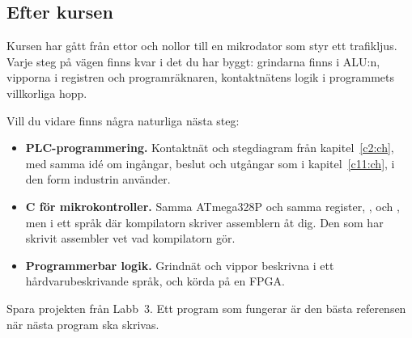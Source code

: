 \subsection*{Efter kursen}
Kursen har gått från ettor och nollor till en mikrodator som styr ett trafikljus. Varje steg på
vägen finns kvar i det du har byggt: grindarna finns i ALU:n, vipporna i registren och
programräknaren, kontaktnätens logik i programmets villkorliga hopp.

Vill du vidare finns några naturliga nästa steg:
\begin{itemize}
  \item \textbf{PLC-programmering.} Kontaktnät och stegdiagram från kapitel~\ref{c2:ch}, med samma
    idé om ingångar, beslut och utgångar som i kapitel~\ref{c11:ch}, i den form industrin
    använder.
  \item \textbf{C för mikrokontroller.} Samma ATmega328P och samma register, ,
     och , men i ett språk där kompilatorn skriver assemblern åt dig. Den
    som har skrivit assembler vet vad kompilatorn gör.
  \item \textbf{Programmerbar logik.} Grindnät och vippor beskrivna i ett hårdvarubeskrivande
    språk, och körda på en FPGA.
\end{itemize}

Spara projekten från Labb~3. Ett program som fungerar är den bästa referensen när nästa program
ska skrivas.
